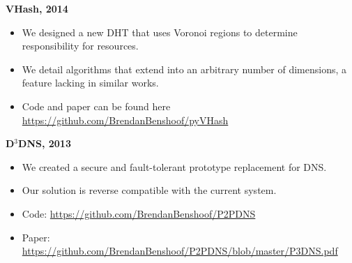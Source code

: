 \documentclass{res}
\begin{document}
\begin{resume}
{\bf VHash, 2014}
    \begin{itemize}
    \item We designed a new DHT that uses Voronoi regions to determine responsibility for resources.
    \item We detail algorithms that extend into an arbitrary number of dimensions, a feature lacking in similar works.
    \item Code and paper can be found here \url{https://github.com/BrendanBenshoof/pyVHash}
    \end{itemize}   


{\bf D$^3$DNS, 2013 }
    \begin{itemize}
    \item We created a secure and fault-tolerant prototype replacement for DNS.
    \item Our solution is reverse compatible with the current system.
    \item Code: \url{https://github.com/BrendanBenshoof/P2PDNS}
    \item Paper: \url{https://github.com/BrendanBenshoof/P2PDNS/blob/master/P3DNS.pdf}
    \end{itemize}

 
%    





\end{resume}
\end{document}
